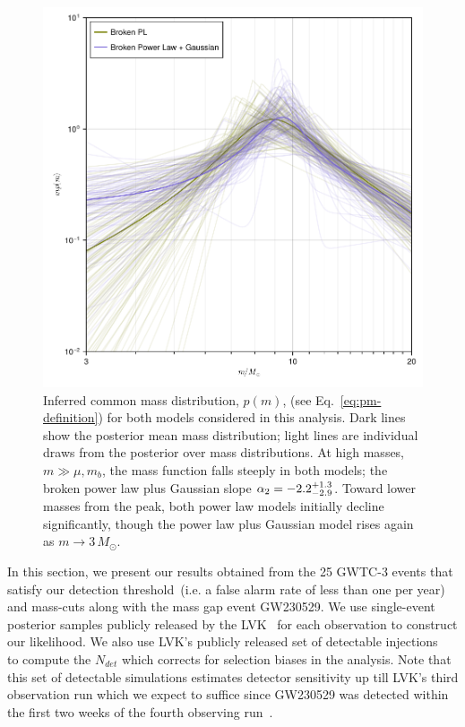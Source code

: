 \documentclass[modern]{aastex631}
\begin{document}
\begin{figure}
    \includegraphics[width=\columnwidth]{figures/pm_traces_including_230529.pdf}
    \caption{\label{fig:pm-traces_including_230529} Inferred common mass distribution, $p(m)$,
    (see Eq.~\eqref{eq:pm-definition}) for both models considered in this
    analysis.  Dark lines show the posterior mean mass distribution; light lines
    are individual draws from the posterior over mass distributions.  At high
    masses, $m \gg \mu, m_b$, the mass function falls steeply in both models;
    the broken power law plus Gaussian slope $\alpha_2 = -2.2^{+1.3}_{-2.9}$.
    Toward lower masses from the peak, both power law models initially decline
    significantly, though the power law plus Gaussian model rises again as $m
    \to 3 \, M_\odot$.}
\end{figure}

In this section, we present our results obtained from the 25 GWTC-3 events that satisfy our detection threshold~(i.e. a false alarm rate of less than one per year) and mass-cuts along with the mass gap event GW230529. We use single-event posterior samples publicly released by the LVK~\citep{gwosco3, gwosco4} for each observation to construct our likelihood. We also use LVK's publicly released set of detectable injections~\citep{gwosco3} to compute the $N_{det}$ which corrects for selection biases in the analysis. Note that this set of detectable simulations estimates detector sensitivity up till LVK's third observation run which we expect to suffice since GW230529 was detected within the first two weeks of the fourth observing run~\citep{LIGOScientific:2024elc}.
\end{document}

